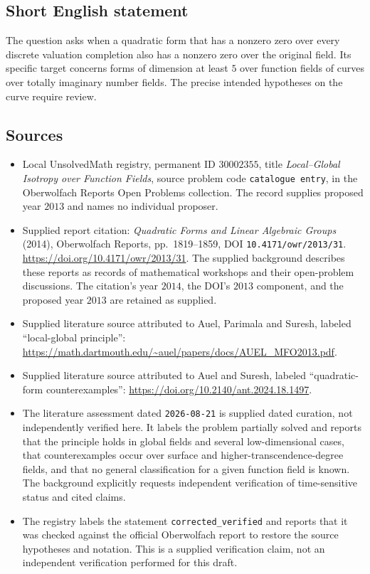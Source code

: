 \documentclass[11pt]{article}
\begin{document}
\subsection{Short English statement}
The question asks when a quadratic form that has a nonzero zero over every discrete valuation completion also has a nonzero zero over the original field. Its specific target concerns forms of dimension at least \(5\) over function fields of curves over totally imaginary number fields. The precise intended hypotheses on the curve require review.
\subsection{Sources}
\begin{itemize}
\item Local UnsolvedMath registry, permanent ID \(30002355\), title \emph{Local--Global Isotropy over Function Fields}, source problem code \texttt{catalogue entry}, in the Oberwolfach Reports Open Problems collection. The record supplies proposed year \(2013\) and names no individual proposer.
\item Supplied report citation: \emph{Quadratic Forms and Linear Algebraic Groups} (2014), Oberwolfach Reports, pp.~1819--1859, DOI \texttt{10.4171/owr/2013/31}. \url{https://doi.org/10.4171/owr/2013/31}. The supplied background describes these reports as records of mathematical workshops and their open-problem discussions. The citation's year \(2014\), the DOI's \(2013\) component, and the proposed year \(2013\) are retained as supplied.
\item Supplied literature source attributed to Auel, Parimala and Suresh, labeled ``local-global principle'': \url{https://math.dartmouth.edu/~auel/papers/docs/AUEL_MFO2013.pdf}.
\item Supplied literature source attributed to Auel and Suresh, labeled ``quadratic-form counterexamples'': \url{https://doi.org/10.2140/ant.2024.18.1497}.
\item The literature assessment dated \texttt{2026-08-21} is supplied dated curation, not independently verified here. It labels the problem partially solved and reports that the principle holds in global fields and several low-dimensional cases, that counterexamples occur over surface and higher-transcendence-degree fields, and that no general classification for a given function field is known. The background explicitly requests independent verification of time-sensitive status and cited claims.
\item The registry labels the statement \texttt{corrected\_verified} and reports that it was checked against the official Oberwolfach report to restore the source hypotheses and notation. This is a supplied verification claim, not an independent verification performed for this draft.
\end{itemize}
\end{document}
